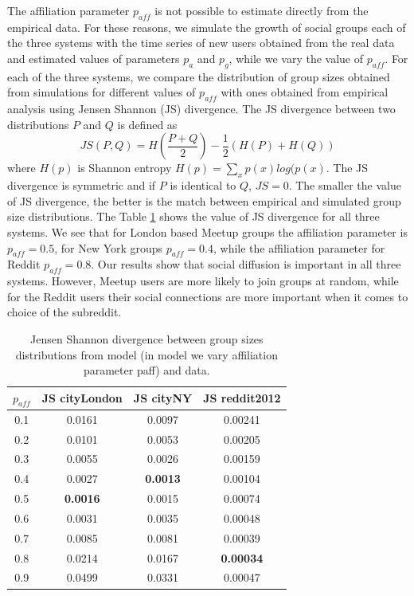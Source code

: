 The affiliation parameter $p_{aff}$ is not possible to estimate directly from the empirical data. For these reasons, we simulate the growth of social groups each of the three systems with the time series of new users obtained from the real data and estimated values of parameters $p_a$ and $p_g$, while we vary the value of $p_{aff}$. For each of the three systems, we compare the distribution of group sizes obtained from simulations for different values of $p_{aff}$ with ones obtained from empirical analysis using Jensen Shannon (JS) divergence. The JS divergence \cite{jsdivergence} between two distributions $P$ and $Q$ is defined as 
\begin{equation}
JS(P, Q) = H(\frac{P+Q}{2}) - \frac{1}{2}(H(P)+H(Q)) \label{eq2}
\end{equation}
where $H(p)$ is Shannon entropy $H(p)=\sum_x p(x)log(p(x)$. The JS divergence is symmetric and if $P$ is identical to $Q$, $JS=0$. The smaller the value of JS divergence, the better is the match between empirical and simulated group size distributions. The Table \ref{tab:table} shows the value of JS divergence for all three systems. We see that for London based Meetup groups the affiliation parameter is $p_{aff}=0.5$, for New York groups $p_{aff}=0.4$, while the affiliation parameter for Reddit $p_{aff}=0.8$. Our results show that social diffusion is important in all three systems. However, Meetup users are more likely to join groups at random, while for the Reddit users their social connections are more important when it comes to choice of the subreddit.  


\begin{table}[]
	\centering
	\begin{tabular}{|c|c|c|c|}
		\hline
		$p_{aff}$ & JS cityLondon   & JS cityNY       & JS reddit2012    \\ \hline
		0.1  & 0.0161          & 0.0097          & 0.00241          \\ \hline
		0.2  & 0.0101          & 0.0053          & 0.00205          \\ \hline
		0.3  & 0.0055          & 0.0026          & 0.00159          \\ \hline
		0.4  & 0.0027          & \textbf{0.0013} & 0.00104          \\ \hline
		0.5  & \textbf{0.0016} & 0.0015          & 0.00074          \\ \hline
		0.6  & 0.0031          & 0.0035          & 0.00048          \\ \hline
		0.7  & 0.0085          & 0.0081          & 0.00039          \\ \hline
		0.8  & 0.0214          & 0.0167          & \textbf{0.00034} \\ \hline
		0.9  & 0.0499          & 0.0331          & 0.00047          \\ \hline
	\end{tabular}
	\caption{Jensen Shannon divergence between group sizes distributions from model
		(in model we vary affiliation parameter paff) and data.}
	\label{tab:table}
\end{table}


